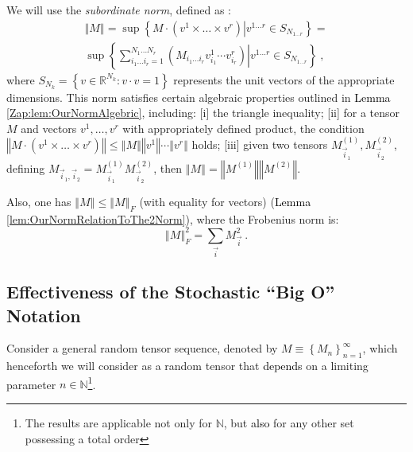 \documentclass{article} %
\begin{document}
We will use the \textit{subordinate norm}, defined as \cite{SubNorm1991}:
\begin{equation}
\label{eq:Norm}
\begin{array}{c}
\left\Vert M\right\Vert =\sup\left\{ \left.M\cdot\left(v^{1}\times\ldots\times v^{r}\right)\right|v^{1\ldots r}\in S_{N_{1\ldots r}}\right\} =\\
\sup\left\{ \left.\sum_{i_{1}\ldots i_{r}=1}^{N_{1}\ldots N_{r}}\left(M_{i_{1}\ldots i_{r}}v_{i_{1}}^{1}\cdots v_{i_{r}}^{r}\right)\right|v^{1\ldots r}\in S_{N_{1\ldots r}}\right\} \ ,
\end{array}
\end{equation}
where \(S_{N_{k}} = \left\{ v \in \mathbb{R}^{N_{k}} : v \cdot v = 1 \right\}\) represents the unit vectors of the appropriate dimensions.
This norm satisfies certain algebraic properties outlined in \textcolor{black}{Lemma} \ref{Zap:lem:OurNormAlgebric}, including: [i] the triangle inequality; [ii] for a tensor \(M\) and vectors \(v^{1},\ldots,v^{r}\) with appropriately defined product, the condition
\(\left\Vert M\cdot\left(v^{1}\times\ldots\times v^{r}\right)\right\Vert \leq\left\Vert M\right\Vert \left\Vert v^{1}\right\Vert \cdots\left\Vert v^{r}\right\Vert\)
holds; [iii] given two tensors \(M^{(1)}_{\vec{i}_1},M^{(2)}_{\vec{i}_2}\), defining
\(M_{\vec{i}_{1},\vec{i}_{2}}=M_{\vec{i}_{1}}^{\left(1\right)}M_{\vec{i}_{2}}^{\left(2\right)}\),
then
\(\left\Vert M\right\Vert=\left\Vert M^{\left(1\right)}\right\Vert \left\Vert M^{\left(2\right)}\right\Vert\).

Also, one has \(\left\Vert M\right\Vert \leq \left\Vert M\right\Vert _{F}\) (with equality for vectors) (\textcolor{black}{Lemma} \ref{lem:OurNormRelationToThe2Norm}),
where the Frobenius norm is:
\begin{equation}
\left\Vert M\right\Vert _{F}^{2} = \sum_{\vec{i}} M_{\vec{i}}^{2} \ .
\label{eq:FrobeniusNorm}
\end{equation}

\subsection{Effectiveness of the Stochastic ``Big O'' Notation}
\label{sec:StochBigO}

Consider a general random tensor sequence, denoted by $M\equiv\left\{ M_{n}\right\} _{n=1}^{\infty}$, which henceforth we will consider as a random tensor that \textcolor{black}{depends} on a limiting parameter $n\in\mathbb{N}$\footnote{The results are applicable not only for $\mathbb{N}$, but \textcolor{black}{also} for any other set possessing a total order}.
\end{document}

